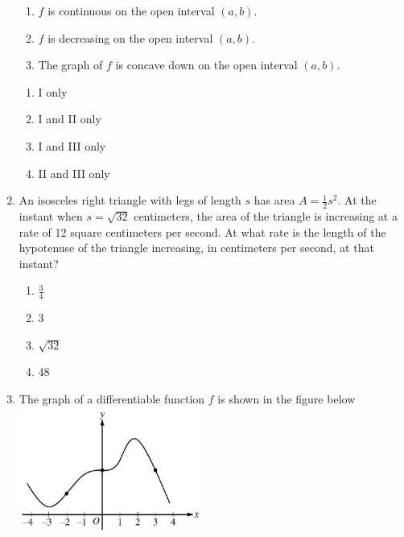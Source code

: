 \documentclass{article}
\begin{document}
\begin{enumerate}
\begin{minipage}[t]{\linewidth}
\begin{enumerate}[label=\Roman*.,leftmargin=1in,topsep=1em]
    \item $f$ is continuous on the open interval $(a, b)$.
    \item $f$ is decreasing on the open interval $(a, b)$.
    \item The graph of $f$ is concave down on the open interval $(a, b)$.
\end{enumerate}
\vspace{1em}
		\begin{enumerate}
		\itemsep1em
			\item I only
			\item I and II only
			\item I and III only
			\item II and III only
		\end{enumerate}
	\end{minipage}
	\item
	\begin{minipage}[t]{\linewidth}
		An isosceles right triangle with legs of length \(s\) has area
\(A=\frac{1}{2} s^{2}\). At the instant when \(s=\sqrt{32}\)
centimeters, the area of the triangle is increasing at a rate of 12
square centimeters per second. At what rate is the length of the
hypotenuse of the triangle increasing, in centimeters per second, at
that instant?
\vspace{1em}
		\begin{enumerate}
		\itemsep1em
			\item \(\frac{3}{4}\)
			\item 3
			\item \(\sqrt{32}\)
			\item 48
		\end{enumerate}
	\end{minipage}
	\item
	\begin{minipage}[t]{\linewidth}
		The graph of a differentiable function \(f\) is shown in the figure
below\\
\includegraphics[width=2.3666666666666667in]{media/6c13bfc0-e550-5dba-b177-16d1151ff55a.jpg}\\

\end{minipage}
\end{enumerate}
\end{document}
